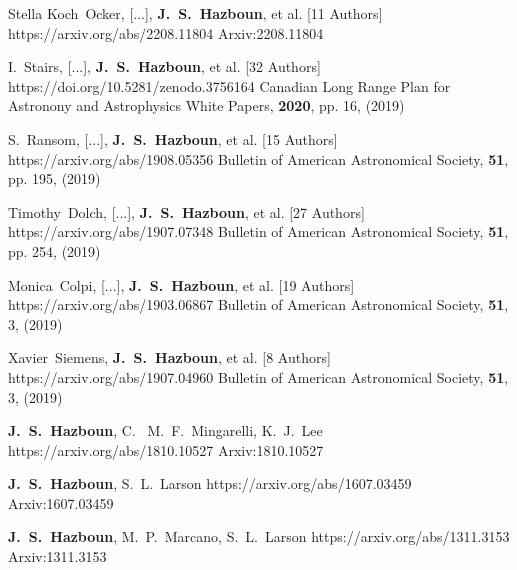          {Stella Koch~{Ocker}, [...], \textbf{J.~S.~{Hazboun}}, et al. [11 Authors]}
         {https://arxiv.org/abs/2208.11804}
         {{Arxiv:}2208.11804}

         {I.~{Stairs}, [...], \textbf{J.~S.~{Hazboun}}, et al. [32 Authors]}
         {https://doi.org/10.5281/zenodo.3756164}
         {{Canadian Long Range Plan for Astronony and Astrophysics White Papers}, \textbf{2020}, pp. 16, (2019)}

         {S.~{Ransom}, [...], \textbf{J.~S.~{Hazboun}}, et al. [15 Authors]}
         {https://arxiv.org/abs/1908.05356}
         {{Bulletin of American Astronomical Society}, \textbf{51}, pp. 195, (2019)}

         {Timothy~{Dolch}, [...], \textbf{J.~S.~{Hazboun}}, et al. [27 Authors]}
         {https://arxiv.org/abs/1907.07348}
         {{Bulletin of American Astronomical Society}, \textbf{51}, pp. 254, (2019)}

         {Monica~{Colpi}, [...], \textbf{J.~S.~{Hazboun}}, et al. [19 Authors]}
         {https://arxiv.org/abs/1903.06867}
         {{Bulletin of American Astronomical Society}, \textbf{51}, 3, (2019)}

         {Xavier~{Siemens}, \textbf{J.~S.~{Hazboun}}, et al. [8 Authors]}
         {https://arxiv.org/abs/1907.04960}
         {{Bulletin of American Astronomical Society}, \textbf{51}, 3, (2019)}

         {\textbf{J.~S.~Hazboun}, C.~ M.~F.~{Mingarelli}, K.~J.~{Lee}}
         {https://arxiv.org/abs/1810.10527}
         {{Arxiv:}1810.10527}

         {\textbf{J.~S.~Hazboun}, S.~L.~{Larson}}
         {https://arxiv.org/abs/1607.03459}
         {{Arxiv:}1607.03459}

         {\textbf{J.~S.~Hazboun}, M.~P.~{Marcano}, S.~L.~{Larson}}
         {https://arxiv.org/abs/1311.3153}
         {{Arxiv:}1311.3153}

